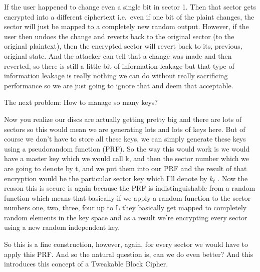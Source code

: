 \documentclass[11pt]{article}
\begin{document}
If the user happened to change even a single bit in sector 1. Then that
sector gets encrypted into a different ciphertext i.e.~even if one bit
of the plaint changes, the sector will just be mapped to a completely
new random output. However, if the user then undoes the change and
reverts back to the original sector (to the original plaintext), then
the encrypted sector will revert back to its, previous, original state.
And the attacker can tell that a change was made and then reverted, so
there is still a little bit of information leakage but that type of
information leakage is really nothing we can do without really
sacrificing performance so we are just going to ignore that and deem
that acceptable.

The next problem: How to manage so many keys?

Now you realize our discs are actually getting pretty big and there are
lots of sectors so this would mean we are generating lots and lots of
keys here. But of course we don't have to store all these keys, we can
simply generate these keys using a pseudorandom function (PRF). So the
way this would work is we would have a master key which we would call k,
and then the sector number which we are going to denote by t, and we put
them into our PRF and the result of that encryption would be the
particular sector key which I'll denote by \(k_{t}\) . Now the reason
this is secure is again because the PRF is indistinguishable from a
random function which means that basically if we apply a random function
to the sector numbers one, two, three, four up to L they basically get
mapped to completely random elements in the key space and as a result
we're encrypting every sector using a new random independent key.

So this is a fine construction, however, again, for every sector we
would have to apply this PRF. And so the natural question is, can we do
even better? And this introduces this concept of a Tweakable Block
Cipher.
\end{document}
